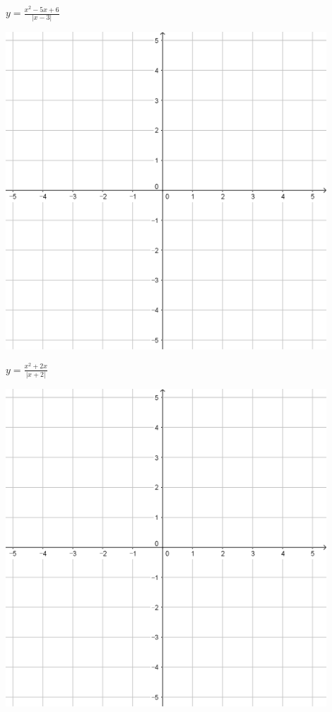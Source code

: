 \documentclass[a4paper]{oblivoir}
\begin{document}
\begin{minipage}{0.45\textwidth}\centering
\(y=\frac{x^2-5x+6}{|x-3|}\)
\par\bigskip\includegraphics[width=0.9\textwidth]{55}
\end{minipage}
\begin{minipage}{0.45\textwidth}\centering
\(y=\frac{x^2+2x}{|x+2|}\)
\par\bigskip\includegraphics[width=0.9\textwidth]{55}
\end{minipage}\bigskip\bigskip\par
\end{document}
